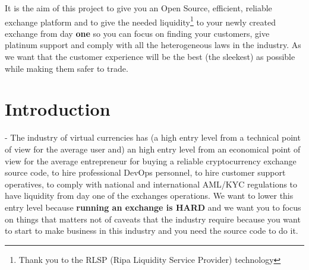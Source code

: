 \documentclass[11pt,fleqn,oneside]{book} %
\begin{document}
It is the aim of this project to give you an Open Source, efficient, reliable exchange platform and to
give the needed liquidity\footnote{Thank you to the RLSP (Ripa Liquidity Service Provider) technology} to your newly created 
exchange from day \textbf{one} so you can focus on finding your customers, give platinum support and comply with all the heterogeneous 
laws in the industry. As we want that the customer experience will be the best (the sleekest) as possible while making them safer to trade.\\
\usechapterimagetrue



\renewcommand*\contentsname{Table of Contents}
\tableofcontents %









\chapter{Introduction}
- The industry of virtual currencies has (a high entry level from a technical point of view for the average user
and) an high entry level from an economical point of view for the average entrepreneur for buying a reliable cryptocurrency 
exchange source code, to hire professional DevOps personnel, to hire customer support operatives, to comply with national and 
international AML/KYC regulations to have liquidity from day one of the exchanges operations. We want to lower this entry level because
\textbf{running an exchange is HARD} and we want you to focus on things that matters not of caveats that the industry require because
you want to start to make business in this industry and you need the source code to do it.
\end{document}
